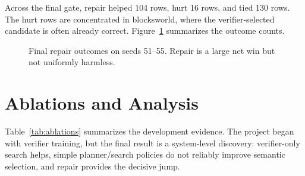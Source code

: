 \documentclass[11pt]{article}
\begin{document}
Across the final gate, repair helped 104 rows, hurt 16 rows, and tied 130 rows.
The hurt rows are concentrated in blocksworld, where the verifier-selected
candidate is often already correct. Figure~\ref{fig:repairoutcomes} summarizes
the outcome counts.

\begin{figure}[t]
\centering
{}
\caption{Final repair outcomes on seeds 51--55. Repair is a large net win but
not uniformly harmless.}
\label{fig:repairoutcomes}
\end{figure}

\section{Ablations and Analysis}

Table~\ref{tab:ablations} summarizes the development evidence. The project
began with verifier training, but the final result is a system-level discovery:
verifier-only search helps, simple planner/search policies do not reliably
improve semantic selection, and repair provides the decisive jump.
\end{document}
